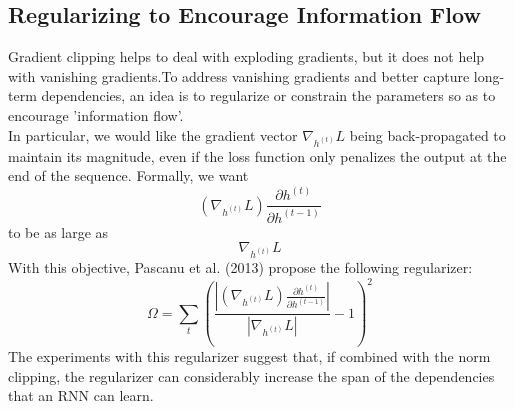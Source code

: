 \subsection{Regularizing to Encourage Information Flow}
Gradient clipping helps to deal with exploding gradients, but it does not help with vanishing gradients.To address vanishing gradients and better capture long-term dependencies, an idea is to regularize or constrain the parameters so as to encourage 'information flow'. \\
In particular, we would like the gradient vector $\nabla_{h^{(t)}}L$ being back-propagated to maintain its magnitude, even if the loss function only penalizes the output at the end of the sequence. Formally, we want
\begin{equation}
(\nabla_{h^{(t)}}L) \frac{\partial h^{(t)}}{\partial h^{(t-1)}}
\end{equation}
to be as large as 
\begin{equation}
\nabla_{h^{(t)}}L
\end{equation}
With this objective, Pascanu et al. (2013) propose the following regularizer:
\begin{equation}
\Omega = \sum_{t}(\frac{|(\nabla_{h^{(t)}}L) \frac{\partial h^{(t)}}{\partial h^{(t-1)}}|}{|\nabla_{h^{(t)}}L|} - 1)^2
\end{equation}
The experiments with this regularizer suggest that, if combined with the norm clipping, the regularizer can considerably increase the span of the dependencies that an RNN can learn.
